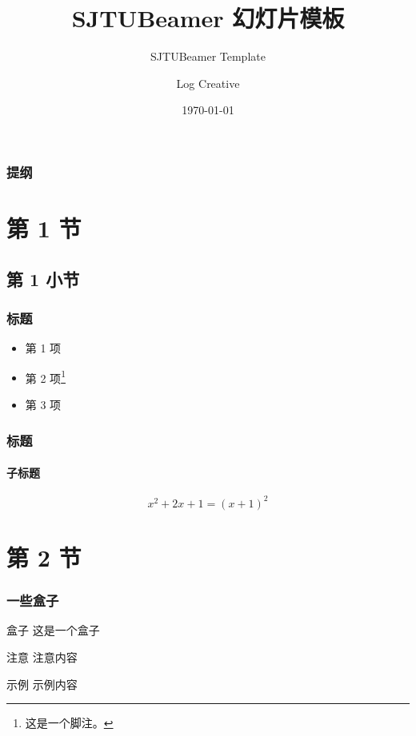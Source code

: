 \documentclass[
]{beamer}
\title{\textsf{SJTUBeamer} 幻灯片模板}  %
\subtitle{SJTUBeamer Template}         %
\author{Log Creative}                  %
\institute[]{github.com/LogCreative}   %
\date{\today}                          %
\begin{document}
    \maketitle                         %

    \begin{frame}
        \frametitle{提纲}
        \tableofcontents               %
    \end{frame}

    \section{第 1 节}
    \subsection{第 1 小节}
    \begin{frame}
        \frametitle{标题}

        \begin{itemize}
            \item 第 1 项
            \item 第 2 项\footnote{这是一个脚注。}
            \item 第 3 项
        \end{itemize}

    \end{frame}

    \begin{frame}
        \frametitle{标题}
        \framesubtitle{子标题}

        \begin{equation}
            x^2+2x+1=(x+1)^2
        \end{equation}
        
    \end{frame}

    \section{第 2 节}
    \begin{frame}
        \frametitle{一些盒子}
        
        \begin{block}{盒子}
            这是一个盒子
        \end{block}

        \begin{alertblock}{注意}
            注意内容
        \end{alertblock}

        \begin{exampleblock}{示例}
            示例内容
        \end{exampleblock}
    \end{frame}
\end{document}
